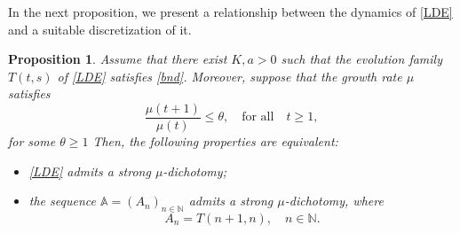 \documentclass[reqno, a4paper, 10pt]{amsart}
\theoremstyle{plain}
\numberwithin{equation}{section}
\newtheorem{proposition}{Proposition}
\theoremstyle{remark}
\def\N{\mathbb{N}}
\begin{document}
In the next proposition, we present a relationship between the dynamics of \eqref{LDE} and a suitable discretization of it. 
\begin{proposition} \label{prop: equiv pol dich contXdisc}
Assume that there exist $K,a>0$ such that the evolution family $T(t,s)$ of \eqref{LDE} satisfies \eqref{bnd}. Moreover, suppose that the growth rate $\mu$ satisfies
\begin{equation}\label{eq: grbound-cont}
	\frac{\mu(t+1)}{\mu (t)}\le \theta, \quad \text{for all} \quad t\geq 1,
\end{equation} 
for some $\theta\ge 1$
Then, the following properties are equivalent:
\begin{itemize}
\item \eqref{LDE} admits a strong $\mu$-dichotomy;
\item the sequence $\mathbb A =(A_n)_{n\in \N}$ admits a strong $\mu$-dichotomy, where
\begin{equation}\label{AN}
A_n=T(n+1, n), \quad n\in \N.
\end{equation}
\end{itemize}
\end{proposition}
\end{document}
